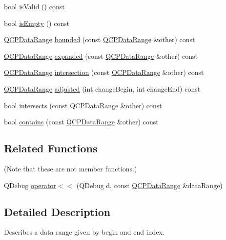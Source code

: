 \begin{DoxyCompactItemize}
\item 
bool \hyperlink{class_q_c_p_data_range_aae53a37472212dca0a7939963e20dba0}{is\+Valid} () const
\item 
bool \hyperlink{class_q_c_p_data_range_ac32e53fc05d6cd2eac96b96a7265d3b8}{is\+Empty} () const
\item 
\hyperlink{class_q_c_p_data_range}{Q\+C\+P\+Data\+Range} \hyperlink{class_q_c_p_data_range_a93529421d12fdd3a8bdb2b8061936352}{bounded} (const \hyperlink{class_q_c_p_data_range}{Q\+C\+P\+Data\+Range} \&other) const
\item 
\hyperlink{class_q_c_p_data_range}{Q\+C\+P\+Data\+Range} \hyperlink{class_q_c_p_data_range_a36c8ad8acf177ffeb0a72c8d73030844}{expanded} (const \hyperlink{class_q_c_p_data_range}{Q\+C\+P\+Data\+Range} \&other) const
\item 
\hyperlink{class_q_c_p_data_range}{Q\+C\+P\+Data\+Range} \hyperlink{class_q_c_p_data_range_a84e1e03129dd52528efb4bac18d30183}{intersection} (const \hyperlink{class_q_c_p_data_range}{Q\+C\+P\+Data\+Range} \&other) const
\item 
\hyperlink{class_q_c_p_data_range}{Q\+C\+P\+Data\+Range} \hyperlink{class_q_c_p_data_range_a279ed36602b39607699dc5652bcaf813}{adjusted} (int change\+Begin, int change\+End) const
\item 
bool \hyperlink{class_q_c_p_data_range_a8a1c437f9beffd55621f48f961d7f679}{intersects} (const \hyperlink{class_q_c_p_data_range}{Q\+C\+P\+Data\+Range} \&other) const
\item 
bool \hyperlink{class_q_c_p_data_range_a13ca398776374a3160aa85433718b812}{contains} (const \hyperlink{class_q_c_p_data_range}{Q\+C\+P\+Data\+Range} \&other) const
\end{DoxyCompactItemize}
\subsection*{Related Functions}
(Note that these are not member functions.) \begin{DoxyCompactItemize}
\item 
Q\+Debug \hyperlink{class_q_c_p_data_range_a486dd7af8a090ed069672e3510e6a082}{operator$<$$<$} (Q\+Debug d, const \hyperlink{class_q_c_p_data_range}{Q\+C\+P\+Data\+Range} \&data\+Range)
\end{DoxyCompactItemize}


\subsection{Detailed Description}
Describes a data range given by begin and end index. 

